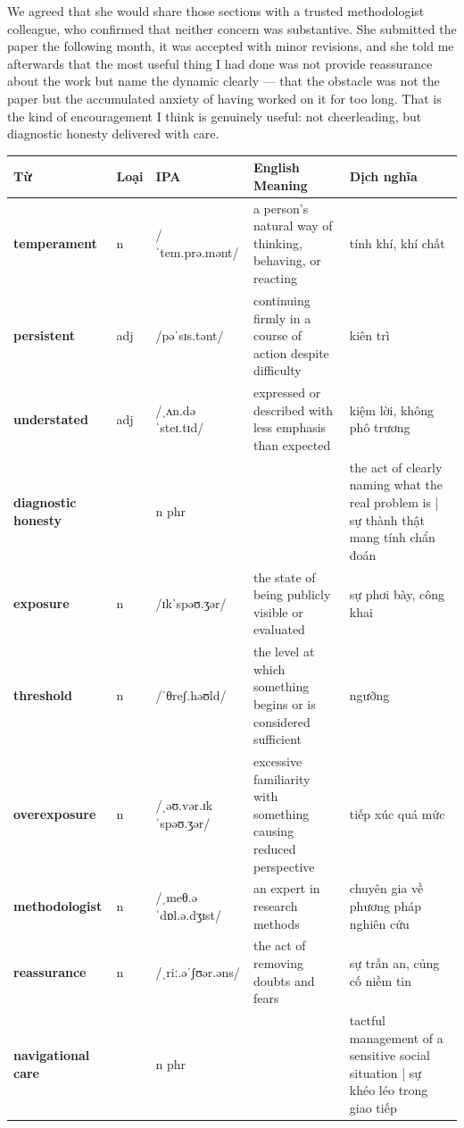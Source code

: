 \begin{ieltsanswer}
We agreed that she would share those sections with a trusted methodologist colleague, who confirmed that neither concern was substantive. She submitted the paper the following month, it was accepted with minor revisions, and she told me afterwards that the most useful thing I had done was not provide reassurance about the work but name the dynamic clearly — that the obstacle was not the paper but the accumulated anxiety of having worked on it for too long. That is the kind of encouragement I think is genuinely useful: not cheerleading, but diagnostic honesty delivered with care.
\end{ieltsanswer}


\vspace{0.8em}
\begin{center}
\renewcommand{\arraystretch}{1.65}
\begin{tabularx}{\textwidth}{|V{0.22\textwidth}|C{0.07\textwidth}|I{0.20\textwidth}|Y|V{0.18\textwidth}|}
\hline
{}
\textbf{Từ} & \textbf{Loại} & \textbf{IPA} & \textbf{English Meaning} & \textbf{Dịch nghĩa} \\
\hline
\textbf{temperament} & n & /ˈtem.prə.mənt/ & a person's natural way of thinking, behaving, or reacting & tính khí, khí chất \\ \hline
\textbf{persistent} & adj & /pəˈsɪs.tənt/ & continuing firmly in a course of action despite difficulty & kiên trì \\ \hline
\textbf{understated} & adj & /ˌʌn.dəˈsteɪ.tɪd/ & expressed or described with less emphasis than expected & kiệm lời, không phô trương \\ \hline
\textbf{diagnostic honesty} & & n phr & & the act of clearly naming what the real problem is | sự thành thật mang tính chẩn đoán \\ \hline
\textbf{exposure} & n & /ɪkˈspəʊ.ʒər/ & the state of being publicly visible or evaluated & sự phơi bày, công khai \\ \hline
\textbf{threshold} & n & /ˈθreʃ.həʊld/ & the level at which something begins or is considered sufficient & ngưỡng \\ \hline
\textbf{overexposure} & n & /ˌəʊ.vər.ɪkˈspəʊ.ʒər/ & excessive familiarity with something causing reduced perspective & tiếp xúc quá mức \\ \hline
\textbf{methodologist} & n & /ˌmeθ.əˈdɒl.ə.dʒɪst/ & an expert in research methods & chuyên gia về phương pháp nghiên cứu \\ \hline
\textbf{reassurance} & n & /ˌriː.əˈʃʊər.əns/ & the act of removing doubts and fears & sự trấn an, củng cố niềm tin \\ \hline
\textbf{navigational care} & & n phr & & tactful management of a sensitive social situation | sự khéo léo trong giao tiếp \\ \hline
\end{tabularx}
\end{center}

